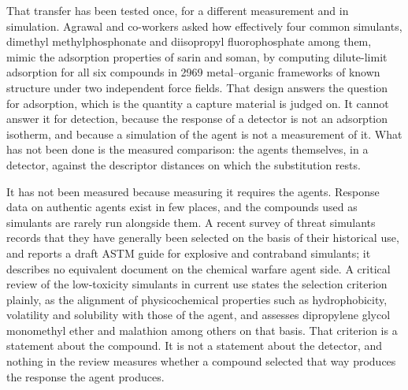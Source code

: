 \documentclass[journal=jacsat,manuscript=article,margin=1in]{achemso}
\begin{document}
That transfer has been tested once, for a different measurement and in
simulation. Agrawal and co-workers asked how effectively four common
simulants, dimethyl methylphosphonate and diisopropyl fluorophosphate among
them, mimic the adsorption properties of sarin and soman, by computing
dilute-limit adsorption for all six compounds in 2969 metal--organic
frameworks of known structure under two independent force
fields.\cite{agrawal2018} That design answers the question for adsorption,
which is the quantity a capture material is judged on. It cannot answer it
for detection, because the response of a detector is not an adsorption
isotherm, and because a simulation of the agent is not a measurement of it.
What has not been done is the measured comparison: the agents themselves, in
a detector, against the descriptor distances on which the substitution
rests.

It has not been measured because measuring it requires the agents. Response
data on authentic agents exist in few places, and the compounds used as
simulants are rarely run alongside them. A recent survey of threat simulants
records that they have generally been selected on the basis of their
historical use, and reports a draft ASTM guide for explosive and contraband
simulants; it describes no equivalent document on the chemical warfare agent
side.\cite{lawrence2025simulants} A critical review of the low-toxicity
simulants in current use states the selection criterion plainly, as the
alignment of physicochemical properties such as hydrophobicity, volatility
and solubility with those of the agent, and assesses dipropylene glycol
monomethyl ether and malathion among others on that
basis.\cite{webb2025} That criterion is a statement about the compound. It
is not a statement about the detector, and nothing in the review measures
whether a compound selected that way produces the response the agent
produces.
\end{document}
